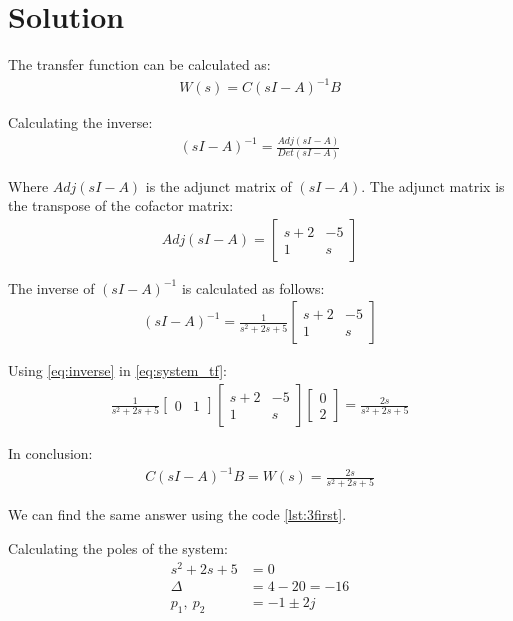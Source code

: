 \documentclass[a4paper]{article}
\begin{document}
\section*{Solution}
The transfer function can be calculated as:
    \begin{align}
		\label{eq:system_tf}        
        W(s) =C(sI-A)^{-1}B
    \end{align}
\par Calculating the inverse: 
\begin{align*}
(sI-A)^{-1}=\frac{Adj(sI-A)}{Det{(sI-A)}}
\end{align*}
\par Where $Adj(sI-A)$ is the adjunct matrix of $(sI-A)$. The adjunct matrix is the transpose of the cofactor matrix:
\begin{align*}
Adj(sI-A) = \begin{bmatrix}
s+2 & -5\\
1 & s 
\end{bmatrix}
\end{align*}
\par The inverse of $(sI-A)^{-1}$ is calculated as follows:
\begin{align}
\label{eq:inverse}
(sI-A)^{-1}=\frac{1}{s^2+2s+5}\begin{bmatrix}
s+2 & -5\\
1 & s 
\end{bmatrix}
\end{align}

Using \eqref{eq:inverse} in \eqref{eq:system_tf}:
\begin{align*}
\frac{1}{s^2+2s+5}\begin{bmatrix}
0 & 1
\end{bmatrix}
\begin{bmatrix}
s+2 & -5\\
1 & s 
\end{bmatrix}\begin{bmatrix}
0 \\ 2
\end{bmatrix}=\frac{2s}{s^2+2s+5}
\end{align*}
\par In conclusion:
 \begin{align*}
C(sI-A)^{-1}B=W(s)=\frac{2s}{s^2+2s+5}
\end{align*}

We can find the same answer using the code \ref{lst:3first}.


Calculating the poles of the system:
\begin{align*}
    s^2+2s+5&=0\\
    \Delta&=4-20=-16\\
    p_1,\ p_2&=-1 \pm 2j
\end{align*}
\end{document}
